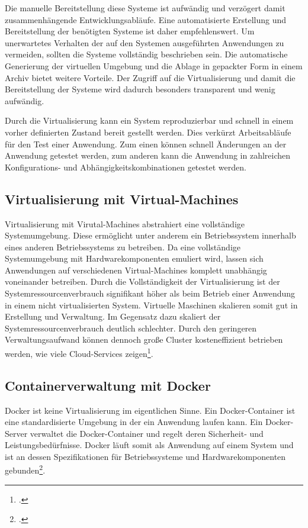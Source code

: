 Die manuelle Bereitstellung diese Systeme ist aufwändig und verzögert damit zusammenhängende Entwicklungsabläufe. Eine 
automatisierte Erstellung und Bereitstellung der benötigten Systeme ist daher empfehlenswert. Um unerwartetes Verhalten 
der auf den Systemen ausgeführten Anwendungen zu vermeiden, sollten die Systeme vollständig beschrieben sein. Die 
automatische Generierung der virtuellen Umgebung und die Ablage in gepackter Form in einem Archiv bietet weitere 
Vorteile. Der Zugriff auf die Virtualisierung und damit die Bereitstellung der Systeme wird dadurch besonders transparent 
und wenig aufwändig.

Durch die Virtualisierung kann ein System reproduzierbar und schnell in einem vorher definierten Zustand bereit gestellt werden. Dies verkürzt Arbeitsabläufe für den Test einer Anwendung. Zum einen können schnell Änderungen an der Anwendung getestet werden, zum anderen kann die Anwendung in zahlreichen Konfigurations- und Abhängigkeitskombinationen getestet werden.

\subsection{Virtualisierung mit Virtual-Machines}

Virtualisierung mit Virutal-Machines abstrahiert eine vollständige Systemumgebung. Diese ermöglicht unter anderem ein Betriebssystem innerhalb eines anderen Betriebssystems zu betreiben. Da eine vollständige Systemumgebung mit Hardwarekomponenten emuliert wird, lassen sich Anwendungen auf verschiedenen Virtual-Machines komplett unabhängig voneinander betreiben. 
Durch die Vollständigkeit der Virtualisierung ist der Systemressourcenverbrauch signifikant höher als beim Betrieb einer Anwendung in einem nicht virtualisierten System. Virtuelle Maschinen skalieren somit gut in Erstellung und Verwaltung. Im Gegensatz dazu skaliert der Systemressourcenverbrauch deutlich schlechter. Durch den geringeren Verwaltungsaufwand können dennoch große Cluster kosteneffizient betrieben werden, wie viele Cloud-Services zeigen\footcite{a-cloud-guru-cost}.

\subsection{Containerverwaltung mit Docker}

Docker ist keine Virtualisierung im eigentlichen Sinne. Ein Docker-Container ist eine standardisierte Umgebung in der ein Anwendung laufen kann. Ein Docker-Server verwaltet die Docker-Container und regelt deren Sicherheit- und Leistungsbedürfnisse. Docker läuft somit als Anwendung auf einem System und ist an dessen Spezifikationen für Betriebssysteme und Hardwarekomponenten gebunden\footcite[Why are containers important][]{learn-docker}.

